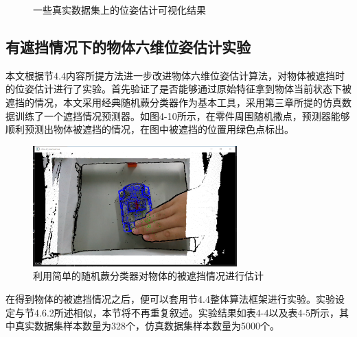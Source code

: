 \begin{figure}[htb]
{%
}
\hspace{0.01\linewidth}
\caption{一些真实数据集上的位姿估计可视化结果}
\end{figure}

\newpage

\subsection{有遮挡情况下的物体六维位姿估计实验}

本文根据节4.4内容所提方法进一步改进物体六维位姿估计算法，对物体被遮挡时的位姿估计进行了实验。首先验证了是否能够通过原始特征拿到物体当前状态下被遮挡的情况，本文采用经典随机蕨分类器作为基本工具，采用第三章所提的仿真数据训练了一个遮挡情况预测器。如图4-10所示，在零件周围随机撒点，预测器能够顺利预测出物体被遮挡的情况，在图中被遮挡的位置用绿色点标出。
\begin{figure}[htb]
	\centering 
	\includegraphics[width=0.7\textwidth]{./mypic/1.png} 
	\caption{利用简单的随机蕨分类器对物体的被遮挡情况进行估计} 
\end{figure}

在得到物体的被遮挡情况之后，便可以套用节4.4整体算法框架进行实验。实验设定与节4.6.2所述相似，本节将不再重复叙述。实验结果如表4-4以及表4-5所示，其中真实数据集样本数量为328个，仿真数据集样本数量为5000个。

